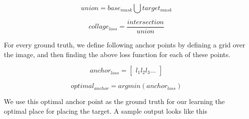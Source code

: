\documentclass{article}
\begin{document}
\begin{equation}
union = base_{mask} \bigcup target_{mask}
\end{equation}

\begin{equation}
collage_{loss} = \frac{intersection}{union}
\end{equation}

For every ground truth, we define following anchor points by defining a grid over the image, and then finding the above loss function for each of these points. 

\begin{equation}
anchor_{loss} = 
\begin{bmatrix}
l_{1} l_{2} l_{3} \ldots 
\end{bmatrix}
\end{equation}

\begin{equation}
    optimal_{anchor} = argmin(anchor_{loss})
\end{equation}

We use this optimal anchor point as the ground truth for our learning the optimal place for placing the target. A sample output looks like this 
\end{document}

